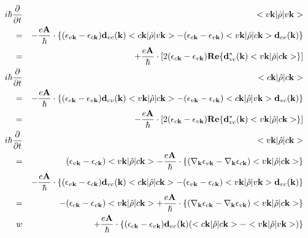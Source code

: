 \documentclass[aps,prb,preprint]{revtex4-1}
\begin{document}
\begin{appendix}
\begin{eqnarray}
i \hbar \frac{ \partial }{\partial t } &&<v{\bf k}| \hat{\rho} |v{\bf k}> \nonumber \\
=&& -\frac{e{\bf A}}{\hbar} \cdot  \{ (\epsilon_{v{\bf k}}-\epsilon_{c{\bf k}}) {\bf d}_{vc}({\bf k}) <c{\bf k}| \hat{\rho} |v{\bf k}>  -  (\epsilon_{c{\bf k}}-\epsilon_{v{\bf k}})<v{\bf k}| \hat{\rho} |c{\bf k}> {\bf d}_{cv}({\bf k}) \nonumber \} \\
=&& +\frac{e{\bf A}}{\hbar} \cdot [2 (\epsilon_{c{\bf k}}-\epsilon_{v{\bf k}}) {\bf Re}\{ {\bf d}_{vc}^*({\bf k}) <v{\bf k}| \hat{\rho} |c{\bf k}> \} ] \\
%
i \hbar \frac{ \partial }{\partial t } &&<c{\bf k}| \hat{\rho} |c{\bf k}> \nonumber \\
=&& -\frac{e{\bf A}}{\hbar} \cdot \{ (\epsilon_{c{\bf k}}-\epsilon_{v{\bf k}}) {\bf d}_{cv}({\bf k}) <v{\bf k}| \hat{\rho} |c{\bf k}>  -  (\epsilon_{v{\bf k}}-\epsilon_{c{\bf k}})<c{\bf k}| \hat{\rho} |v{\bf k}> {\bf d}_{vc}({\bf k}) \} \nonumber \\
=&& -\frac{e{\bf A}}{\hbar} \cdot [ 2 (\epsilon_{c{\bf k}}-\epsilon_{v{\bf k}}) {\bf Re}\{ {\bf d}_{vc}^*({\bf k}) <v{\bf k}| \hat{\rho} |c{\bf k}> \} ] \\
%
i \hbar \frac{ \partial }{\partial t } &&<v{\bf k}| \hat{\rho} |c{\bf k}> \nonumber \\
= && (\epsilon_{v{\bf k}}-\epsilon_{c{\bf k}}) <v{\bf k}| \hat{\rho} |c{\bf k}>  -\frac{e{\bf A}}{\hbar} \cdot \{ (\nabla_{\bf k} \epsilon_{v{\bf k}} - \nabla_{\bf k} \epsilon_{c{\bf k}}) <v{\bf k}| \hat{\rho} |c{\bf k}> \} \nonumber  \\
&& -\frac{e{\bf A}}{\hbar} \cdot  \{ (\epsilon_{v{\bf k}}-\epsilon_{c{\bf k}}) {\bf d}_{vc}({\bf k}) <c{\bf k}| \hat{\rho} |c{\bf k}>  -  (\epsilon_{v{\bf k}}-\epsilon_{c{\bf k}})<v{\bf k}| \hat{\rho} |v{\bf k}> {\bf d}_{vc}({\bf k}) \} \nonumber \\
= && - (\epsilon_{c{\bf k}}-\epsilon_{v{\bf k}}) <v{\bf k}| \hat{\rho} |c{\bf k}>  + \frac{e{\bf A}}{\hbar} \cdot \{ (\nabla_{\bf k} \epsilon_{c{\bf k}} - \nabla_{\bf k} \epsilon_{v{\bf k}}) <v{\bf k}| \hat{\rho} |c{\bf k}> \} \nonumber  \\w
&& + \frac{e{\bf A}}{\hbar} \cdot  \{ (\epsilon_{c{\bf k}}-\epsilon_{v{\bf k}}) {\bf d}_{vc}({\bf k}) ( <c{\bf k}| \hat{\rho} |c{\bf k}> - <v{\bf k}| \hat{\rho} |v{\bf k}> ) \}
\end{eqnarray}


\end{appendix}
\end{document}
